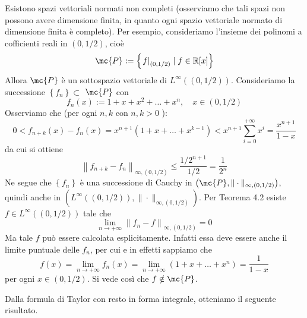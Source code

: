 \begin{oss}
    Esistono spazi vettoriali normati non completi (osserviamo che tali spazi non possono avere dimensione finita, in quanto ogni spazio vettoriale normato di dimensione finita è completo). Per esempio, consideriamo l'insieme dei polinomi a cofficienti reali in $(0,1 / 2)$, cioè
    \[\mc{P}:=\left\{\left.f\right|_{(0,1 / 2)} \mid f \in \mathbb{R}[x]\right\}\]
    Allora $\mc{P}$ è un sottospazio vettoriale di $L^{\infty}((0,1 / 2))$. Consideriamo la successione $\left\{f_{n}\right\} \subset$ $\mc{P}$ con
    \[f_{n}(x):=1+x+x^{2}+\ldots+x^{n}, \quad x \in(0,1 / 2)\]
    Osserviamo che (per ogni $n, k$ con $n, k>0$ ):
    \[0<f_{n+k}(x)-f_{n}(x)=x^{n+1}\left(1+x+\ldots+x^{k-1}\right)<x^{n+1} \sum_{i=0}^{+\infty} x^{i}=\frac{x^{n+1}}{1-x}\]
    da cui si ottiene
    \[\left\|f_{n+k}-f_{n}\right\|_{\infty,(0,1 / 2)} \leq \frac{1 / 2^{n+1}}{1 / 2}=\frac{1}{2^{n}}\]
    Ne segue che $\left\{f_{n}\right\}$ è una successione di Cauchy in $\left(\mc{P},\|\cdot\|_{\infty,(0,1 / 2)}\right)$, quindi anche in $\left(L^{\infty}((0,1 / 2)),\|\cdot\|_{\infty,(0,1 / 2)}\right)$. Per Teorema 4.2 esiste $f \in L^{\infty}((0,1 / 2))$ tale che
    \[\lim _{n \rightarrow+\infty}\left\|f_{n}-f\right\|_{\infty,(0,1 / 2)}=0\]
    Ma tale $f$ può essere calcolata esplicitamente. Infatti essa deve essere anche il limite puntuale delle $f_{n}$, per cui e in effetti sappiamo che
    \[f(x)=\lim _{n \rightarrow+\infty} f_{n}(x)=\lim _{n \rightarrow+\infty}\left(1+x+\ldots+x^{n}\right)=\frac{1}{1-x}\]
    per ogni $x \in(0,1 / 2)$. Si vede così che $f \notin \mc{P}$.
    
\end{oss}

Dalla formula di Taylor con resto in forma integrale, otteniamo il seguente risultato.

